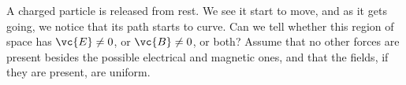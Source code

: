         A charged particle is released from rest. We see it start to move,
        and as it gets going, we notice that its path starts to curve. Can
        we tell whether this region of space has $\vc{E}\neq 0$, or $\vc{B}\neq 0$, or both?
        Assume that no other forces are present besides the possible electrical and magnetic ones,
        and that the fields, if they are present, are uniform.
